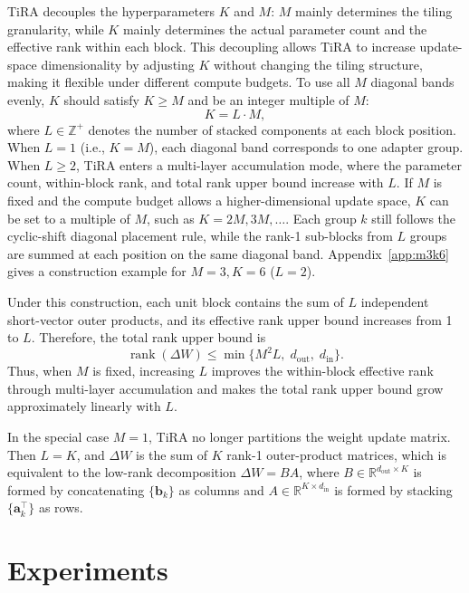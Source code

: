 \documentclass[a4paper,11pt]{article}
\newcommand{\R}{\mathbb{R}}
\newcommand{\DeltaW}{\Delta W}
\newcommand{\rank}{\operatorname{rank}}
\begin{document}
TiRA decouples the hyperparameters $K$ and $M$: $M$ mainly determines the tiling granularity, while $K$ mainly determines the actual parameter count and the effective rank within each block. This decoupling allows TiRA to increase update-space dimensionality by adjusting $K$ without changing the tiling structure, making it flexible under different compute budgets. To use all $M$ diagonal bands evenly, $K$ should satisfy $K\geq M$ and be an integer multiple of $M$:
\begin{equation}
    K=L\cdot M,
\end{equation}
where $L\in\mathbb{Z}^{+}$ denotes the number of stacked components at each block position. When $L=1$ (i.e., $K=M$), each diagonal band corresponds to one adapter group. When $L\geq2$, TiRA enters a multi-layer accumulation mode, where the parameter count, within-block rank, and total rank upper bound increase with $L$. If $M$ is fixed and the compute budget allows a higher-dimensional update space, $K$ can be set to a multiple of $M$, such as $K=2M,3M,\ldots$. Each group $k$ still follows the cyclic-shift diagonal placement rule, while the rank-1 sub-blocks from $L$ groups are summed at each position on the same diagonal band. Appendix~\ref{app:m3k6} gives a construction example for $M=3,K=6$ ($L=2$).

Under this construction, each unit block contains the sum of $L$ independent short-vector outer products, and its effective rank upper bound increases from 1 to $L$. Therefore, the total rank upper bound is
\begin{equation}
    \rank(\DeltaW)\leq \min\{M^2L,\;d_{\mathrm{out}},\;d_{\mathrm{in}}\}.
\end{equation}
Thus, when $M$ is fixed, increasing $L$ improves the within-block effective rank through multi-layer accumulation and makes the total rank upper bound grow approximately linearly with $L$.

In the special case $M=1$, TiRA no longer partitions the weight update matrix. Then $L=K$, and $\DeltaW$ is the sum of $K$ rank-1 outer-product matrices, which is equivalent to the low-rank decomposition $\DeltaW=BA$, where $B\in\R^{d_{\mathrm{out}}\times K}$ is formed by concatenating $\{\bm{b}_k\}$ as columns and $A\in\R^{K\times d_{\mathrm{in}}}$ is formed by stacking $\{\bm{a}_k^{\top}\}$ as rows.

\section{Experiments}
\end{document}
